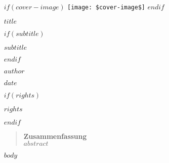 \documentclass[12pt,a4paper]{article}
\begin{document}
\begin{titlepage}
  \centering
  $if(cover-image)$
  \texttt{[image: \$cover-image\$]}
  \vspace{1cm}
  \newpage
  $endif$
  {\Huge \bfseries $title$ \par}
  $if(subtitle)$
  \vspace{0.5cm}
  {\Large \textit{$subtitle$} \par}
  $endif$
  \vspace{1cm}
  {\Large $author$ \par}
  \vspace{1cm}
  {\large $date$ \par}
  $if(rights)$
  \vspace{1cm}
  {\small $rights$ \par}
  $endif$
  \vfill
\end{titlepage}

\newpage
\begin{abstract}
\noindent\textbf{Zusammenfassung}\\[0.5em]
$abstract$
\end{abstract}

\newpage
\tableofcontents
\newpage

$body$
\end{document}
